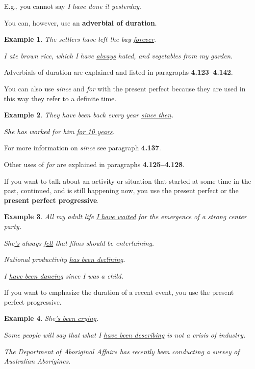 \documentclass[oneside]{book}
\numberwithin{equation}{section}
\newtheorem{example}{Example}[section]
\begin{document}
E.g., you cannot say \textit{I have done it yesterday}.

%
You can, however, use an \textbf{adverbial of duration}.
\begin{example}
    The settlers have left the bay \underline{forever}.
    
    I ate brown rice, which I have \underline{always} hated, and vegetables from my garden.
\end{example}
Adverbials of duration are explained and listed in paragraphs \textbf{4.123--4.142}.

%
You can also use \textit{since} and \textit{for} with the present perfect because they are used in this way they refer to a definite time.
\begin{example}
    They have been back every year \underline{since then}.
    
    She has worked for him \underline{for 10 years}.
\end{example}
For more information on \textit{since} see paragraph \textbf{4.137}.

Other uses of \textit{for} are explained in paragraphs \textbf{4.125--4.128}.

%
\noindent{} If you want to talk about an activity or situation that started at some time in the past, continued, and is still happening now, you use the present perfect or the \textbf{present perfect progressive}.
\begin{example}
    All my adult life \underline{I have waited} for the emergence of a strong center party.
    
    She\underline{'s} always \underline{felt} that films should be entertaining.
    
    National productivity \underline{has been declining}.
    
    I \underline{have been dancing} since I was a child.
\end{example}
%
\noindent{} If you want to emphasize the duration of a recent event, you use the present perfect progressive.
\begin{example}
    She\underline{'s been crying}.
    
    Some people will say that what I \underline{have been describing} is not a crisis of industry.
    
    The Department of Aboriginal Affairs \underline{has} recently \underline{been conducting} a survey of Australian Aborigines.
\end{example}
\end{document}
